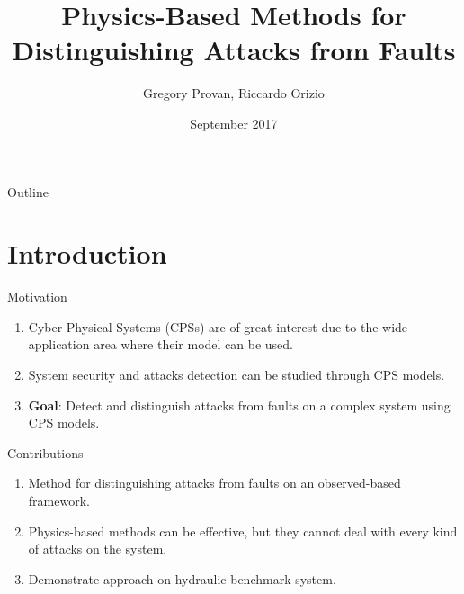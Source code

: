 \documentclass{beamer}
\title[CENICS 2017]{Physics-Based Methods for Distinguishing Attacks from Faults}
\author[Provan G., Orizio R.]{\alert{Gregory Provan, Riccardo Orizio}}
\institute[UCC]{\alert{University College Cork}}
\date[September 2017]{\alert{September 2017}}
\def\itemizespace{\vspace{3mm}}
\begin{document}
\begin{frame}
	\titlepage
\end{frame}

\begin{frame}{Outline}
	\tableofcontents
\end{frame}


\section{Introduction}

\begin{frame}{Motivation}
	\begin{enumerate}
		\item \alert<+>{Cyber-Physical Systems (CPSs) are of great interest due
			to the wide application area where their model can be used.}

		\itemizespace

		\item \alert<+>{System security and attacks detection can be studied
			through CPS models.}

		\itemizespace

		\item \alert<+>{\textbf{Goal}: Detect and distinguish attacks from
			faults on a complex system using CPS models.}
	\end{enumerate}
\end{frame}

\begin{frame}{Contributions}
	\begin{enumerate}
		\item \alert<+>{Method for distinguishing attacks from faults on an
			observed-based framework.}

		\itemizespace

		\item \alert<+>{Physics-based methods can be effective, but they cannot
			deal with every kind of attacks on the system.}

		\itemizespace

		\item \alert<+>{Demonstrate approach on hydraulic benchmark system.}
	\end{enumerate}
\end{frame}

\end{document}
